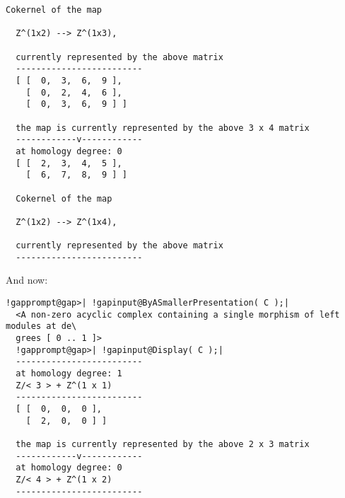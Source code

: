 \documentclass[a4paper,11pt]{report}
\begin{document}
{{{\begin{Verbatim}[commandchars=!@|,fontsize=\small,frame=single,label=Example]
  Cokernel of the map
  
  Z^(1x2) --> Z^(1x3),
  
  currently represented by the above matrix
  -------------------------
  [ [  0,  3,  6,  9 ],
    [  0,  2,  4,  6 ],
    [  0,  3,  6,  9 ] ]
  
  the map is currently represented by the above 3 x 4 matrix
  ------------v------------
  at homology degree: 0
  [ [  2,  3,  4,  5 ],
    [  6,  7,  8,  9 ] ]
  
  Cokernel of the map
  
  Z^(1x2) --> Z^(1x4),
  
  currently represented by the above matrix
  -------------------------
\end{Verbatim}
 And now: 
\begin{Verbatim}[commandchars=!@|,fontsize=\small,frame=single,label=Example]
  !gapprompt@gap>| !gapinput@ByASmallerPresentation( C );|
  <A non-zero acyclic complex containing a single morphism of left modules at de\
  grees [ 0 .. 1 ]>
  !gapprompt@gap>| !gapinput@Display( C );|
  -------------------------
  at homology degree: 1
  Z/< 3 > + Z^(1 x 1)
  -------------------------
  [ [  0,  0,  0 ],
    [  2,  0,  0 ] ]
  
  the map is currently represented by the above 2 x 3 matrix
  ------------v------------
  at homology degree: 0
  Z/< 4 > + Z^(1 x 2)
  -------------------------
\end{Verbatim}
 }

 }

  }

   
\end{document}
